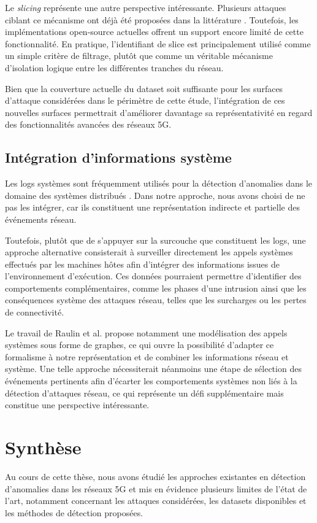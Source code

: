 \documentclass[a4paper,11pt,twoside]{StyleThese}
\begin{document}
Le \textit{slicing} représente une autre perspective intéressante. Plusieurs attaques ciblant ce mécanisme ont déjà été proposées dans la littérature \cite{slice2,slice3}. Toutefois, les implémentations open-source actuelles offrent un support encore limité de cette fonctionnalité. En pratique, l'identifiant de slice est principalement utilisé comme un simple critère de filtrage, plutôt que comme un véritable mécanisme d'isolation logique entre les différentes tranches du réseau.

Bien que la couverture actuelle du dataset soit suffisante pour les surfaces d'attaque considérées dans le périmètre de cette étude, l'intégration de ces nouvelles surfaces permettrait d'améliorer davantage sa représentativité en regard des fonctionnalités avancées des réseaux 5G.

\subsection{Intégration d'informations système}
Les logs systèmes sont fréquemment utilisés pour la détection d'anomalies dans le domaine des systèmes distribués \cite{dist_log_trace}. Dans notre approche, nous avons choisi de ne pas les intégrer, car ils constituent une représentation indirecte et partielle des événements réseau. 

Toutefois, plutôt que de s'appuyer sur la surcouche que constituent les logs, une approche alternative consisterait à surveiller directement les appels systèmes effectués par les machines hôtes afin d'intégrer des informations issues de l'environnement d'exécution. Ces données pourraient permettre d'identifier des comportements complémentaires, comme les phases d'une intrusion ainsi que les conséquences système des attaques réseau, telles que les surcharges ou les pertes de connectivité.

Le travail de Raulin et al. \cite{baguette} propose notamment une modélisation des appels systèmes sous forme de graphes, ce qui ouvre la possibilité d'adapter ce formalisme à notre représentation et de combiner les informations réseau et système. Une telle approche nécessiterait néanmoins une étape de sélection des événements pertinents afin d'écarter les comportements systèmes non liés à la détection d'attaques réseau, ce qui représente un défi supplémentaire mais constitue une perspective intéressante.

\section{Synthèse}
Au cours de cette thèse, nous avons étudié les approches existantes en détection d'anomalies dans les réseaux 5G et mis en évidence plusieurs limites de l'état de l'art, notamment concernant les attaques considérées, les datasets disponibles et les méthodes de détection proposées.
\end{document}
